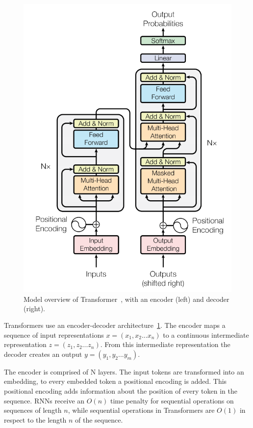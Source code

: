 \begin{figure}[H]
  \centering
  \includegraphics[width=\linewidth]{img/transformer.png}
  \caption{Model overview of Transformer~\cite{Transformers}, with an encoder (left) and 
  decoder (right).}
  \label{fig:transformers}
\end{figure}

Transformers use an encoder-decoder architecture~\ref{fig:transformers}. The encoder maps a sequence of input representations \(x = (x_1,x_2 ... x_n)\) to a continuous intermediate representation \(z = (z_1,z_2 ... z_n)\). From this intermediate representation the decoder creates an output \(y = (y_1,y_2 ... y_m)\). 

The encoder is comprised of N layers. The input tokens are transformed into an embedding, to every embedded token a positional encoding is added. This positional encoding adds information about the position of every token in the sequence. RNNs receive an \(O(n)\) time penalty for sequential operations on sequences of length \(n\), while sequential operations in Transformers are \(O(1)\) in respect to the length \(n\) of the sequence.

